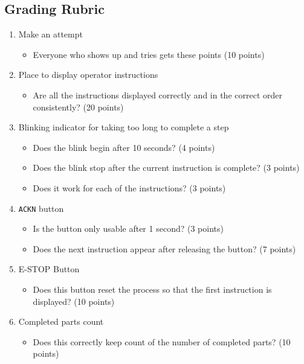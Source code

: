 \begin{samepage}
\section{Grading Rubric}

\begin{enumerate}
    \item Make an attempt
    \begin{itemize}
        \item Everyone who shows up and tries gets these points (10 points)
    \end{itemize}
    
    \item Place to display operator instructions
    \begin{itemize}
        \item Are all the instructions displayed correctly and in the correct order consistently? (20 points)
    \end{itemize}
    
    \item Blinking indicator for taking too long to complete a step 
    \begin{itemize}
        \item Does the blink begin after 10 seconds? (4 points)
        \item Does the blink stop after the current instruction is complete? (3 points)
        \item Does it work for each of the instructions? (3 points)
    \end{itemize}
    
    \item \verb|ACKN| button
    \begin{itemize}
        \item Is the button only usable after 1 second? (3 points)
        \item Does the next instruction appear after releasing the button? (7 points)
    \end{itemize}
    
    \item E-STOP Button
    \begin{itemize}
        \item Does this button reset the process so that the first instruction is displayed? (10 points)
    \end{itemize}
    
    \item Completed parts count
    \begin{itemize}
        \item Does this correctly keep count of the number of completed parts? (10 points)
    \end{itemize}
    

\end{enumerate}
\end{samepage}
